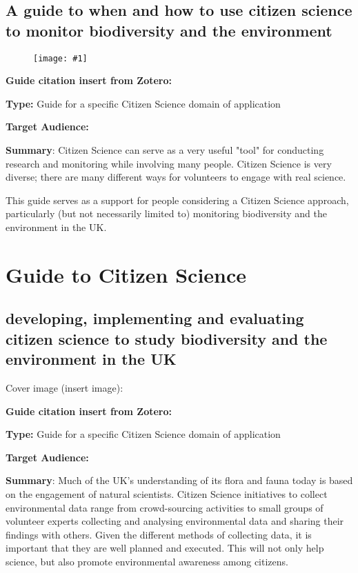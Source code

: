 \documentclass{article}
\newlength{\imgwidth}
\newcommand\scaledgraphics[2]{%
                
\settowidth{\imgwidth}{\texttt{[image: \#1]}}%
                
\setlength{\imgwidth}{\minof{\imgwidth}{#2\textwidth}}%
                
\texttt{[image: \#1]}%
                
}
\begin{document}
\subsection{A guide to when and how to use citizen science to monitor biodiversity and the environment}\label{H8816796}


\begin{figure}
\scaledgraphics{dba5d5eb-235c-4694-a2d4-c26b6e16182b.png}{0.5}
\label{F60064251}
\end{figure}


\textbf{Guide citation insert from Zotero:} \autocite{pocock_choosing_2014}


\textbf{Type: }Guide for a specific Citizen Science domain of application


\textbf{Target Audience:}


\textbf{Summary}: Citizen Science can serve as a very useful "tool" for conducting research and monitoring while involving many people. Citizen Science is very diverse; there are many different ways for volunteers to engage with real science.


This guide serves as a support for people considering a Citizen Science approach, particularly (but not necessarily limited to) monitoring biodiversity and the environment in the UK.


\section{Guide to Citizen Science}\label{H3514415}



\subsection{developing, implementing and evaluating citizen science to study biodiversity and the environment in the UK}\label{H903150}



Cover image (insert image):


\textbf{Guide citation insert from Zotero:} \autocite{tweddle_guide_2012}


\textbf{Type: }Guide for a specific Citizen Science domain of application


\textbf{Target Audience:}


\textbf{Summary}: Much of the UK's understanding of its flora and fauna today is based on the engagement of natural scientists. Citizen Science initiatives to collect environmental data range from crowd-sourcing activities to small groups of volunteer experts collecting and analysing environmental data and sharing their findings with others. Given the different methods of collecting data, it is important that they are well planned and executed. This will not only help science, but also promote environmental awareness among citizens.
\end{document}
